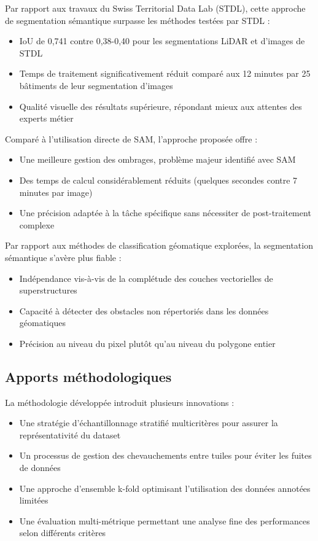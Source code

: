 Par rapport aux travaux du Swiss Territorial Data Lab (STDL), cette approche de segmentation sémantique surpasse les méthodes testées par STDL :
\begin{itemize}
    \item IoU de 0,741 contre 0,38-0,40 pour les segmentations LiDAR et d'images de STDL
    \item Temps de traitement significativement réduit comparé aux 12 minutes par 25 bâtiments de leur segmentation d'images
    \item Qualité visuelle des résultats supérieure, répondant mieux aux attentes des experts métier
\end{itemize}

Comparé à l'utilisation directe de SAM, l'approche proposée offre :
\begin{itemize}
    \item Une meilleure gestion des ombrages, problème majeur identifié avec SAM
    \item Des temps de calcul considérablement réduits (quelques secondes contre 7 minutes par image)
    \item Une précision adaptée à la tâche spécifique sans nécessiter de post-traitement complexe
\end{itemize}

Par rapport aux méthodes de classification géomatique explorées, la segmentation sémantique s'avère plus fiable :
\begin{itemize}
    \item Indépendance vis-à-vis de la complétude des couches vectorielles de superstructures
    \item Capacité à détecter des obstacles non répertoriés dans les données géomatiques
    \item Précision au niveau du pixel plutôt qu'au niveau du polygone entier
\end{itemize}

\subsection{Apports méthodologiques}

La méthodologie développée introduit plusieurs innovations :
\begin{itemize}
    \item Une stratégie d'échantillonnage stratifié multicritères pour assurer la représentativité du dataset
    \item Un processus de gestion des chevauchements entre tuiles pour éviter les fuites de données
    \item Une approche d'ensemble k-fold optimisant l'utilisation des données annotées limitées
    \item Une évaluation multi-métrique permettant une analyse fine des performances selon différents critères
\end{itemize}

